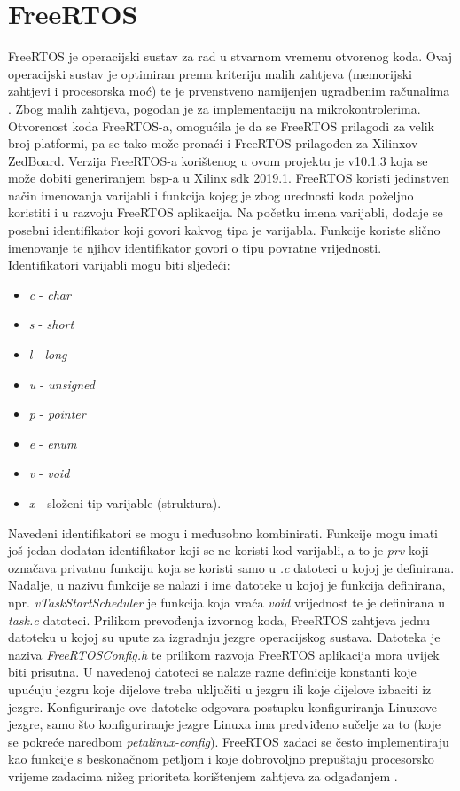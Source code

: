 \documentclass[times, utf8, diplomski, numeric]{fer}
\begin{document}
\section{FreeRTOS}
FreeRTOS je operacijski sustav za rad u stvarnom vremenu otvorenog koda. Ovaj operacijski sustav je optimiran prema kriteriju
malih zahtjeva (memorijski zahtjevi i procesorska moć) te je prvenstveno namijenjen ugradbenim računalima \cite{osur}. Zbog
malih zahtjeva, pogodan je za implementaciju na mikrokontrolerima. Otvorenost koda FreeRTOS-a, omogućila je da se FreeRTOS
prilagodi za velik broj platformi, pa se tako može pronaći i FreeRTOS prilagođen za Xilinxov ZedBoard. Verzija FreeRTOS-a
korištenog u ovom projektu je v10.1.3 koja se može dobiti generiranjem \gls{bsp}-a  u Xilinx \gls{sdk}
2019.1. FreeRTOS koristi jedinstven način imenovanja varijabli i funkcija kojeg je zbog urednosti koda poželjno koristiti i
u razvoju FreeRTOS aplikacija. Na početku imena varijabli, dodaje se posebni identifikator koji govori kakvog tipa je
varijabla. Funkcije koriste slično imenovanje te njihov identifikator govori o tipu povratne vrijednosti. Identifikatori
varijabli mogu biti sljedeći:
\begin{itemize}
  \item{\textit{c} - \textit{char}}
  \item{\textit{s} - \textit{short}}
  \item{\textit{l} - \textit{long}}
  \item{\textit{u} - \textit{unsigned}}
  \item{\textit{p} - \textit{pointer}}
  \item{\textit{e} - \textit{enum}}
  \item{\textit{v} - \textit{void}}
  \item{\textit{x} - složeni tip varijable (struktura).}
\end{itemize}
Navedeni identifikatori se mogu i međusobno kombinirati. Funkcije mogu imati još jedan dodatan identifikator koji se ne koristi
kod varijabli, a to je \textit{prv} koji označava privatnu funkciju koja se koristi samo u \textit{.c} datoteci u kojoj je
definirana. Nadalje, u nazivu funkcije se nalazi i ime datoteke u kojoj je funkcija definirana, npr.
\textit{vTaskStartScheduler} je funkcija koja vraća \textit{void} vrijednost te je definirana u \textit{task.c} datoteci.
Prilikom prevođenja izvornog koda, FreeRTOS zahtjeva jednu datoteku u kojoj su upute za izgradnju jezgre operacijskog sustava.
Datoteka je naziva \textit{FreeRTOSConfig.h} te prilikom razvoja FreeRTOS aplikacija mora uvijek biti prisutna. U navedenoj
datoteci se nalaze razne definicije konstanti koje upućuju jezgru koje dijelove treba uključiti u jezgru ili koje dijelove
izbaciti iz jezgre. Konfiguriranje ove datoteke odgovara postupku konfiguriranja Linuxove jezgre, samo što konfiguriranje
jezgre Linuxa ima predviđeno sučelje za to (koje se pokreće naredbom \textit{petalinux-config}). FreeRTOS zadaci se često
implementiraju kao funkcije s beskonačnom petljom i koje dobrovoljno prepuštaju procesorsko vrijeme zadacima nižeg prioriteta
korištenjem zahtjeva za odgađanjem .
\end{document}
